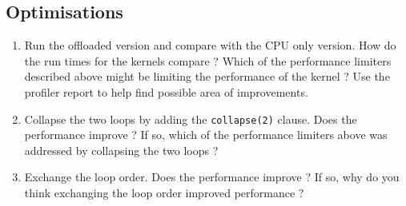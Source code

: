 \documentclass{article}
\begin{document}
\subsection{ Optimisations}
\begin{enumerate}
    \item Run the offloaded version and compare with the CPU only version. How do the run times for the kernels compare ? Which of the performance limiters described above might be limiting the performance of the kernel ? Use the profiler report to help find possible area of improvements.
    \item Collapse the two loops by adding the \texttt{collapse(2)} clause. Does the performance improve ? If so, which of the performance limiters above  was addressed by collapsing the two loops ?
    \item Exchange the loop order. Does the performance improve ? If so, why do you think exchanging the loop order improved performance ?
\end{enumerate}
\end{document}
